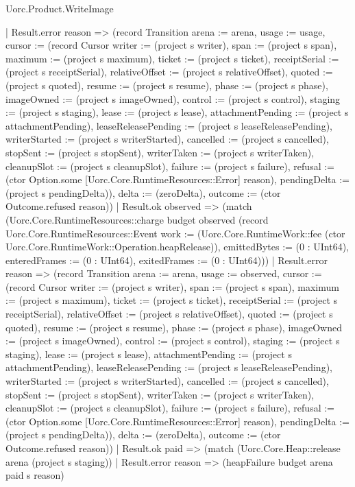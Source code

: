 \begin{lexlean}{Uorc.Product.WriteImage}
\begin{semanticmodule}
{        | Result.error reason => (record Transition {arena := arena, usage := usage, cursor := (record Cursor {writer := (project s writer), span := (project s span), maximum := (project s maximum), ticket := (project s ticket), receiptSerial := (project s receiptSerial), relativeOffset := (project s relativeOffset), quoted := (project s quoted), resume := (project s resume), phase := (project s phase), imageOwned := (project s imageOwned), control := (project s control), staging := (project s staging), lease := (project s lease), attachmentPending := (project s attachmentPending), leaseReleasePending := (project s leaseReleasePending), writerStarted := (project s writerStarted), cancelled := (project s cancelled), stopSent := (project s stopSent), writerTaken := (project s writerTaken), cleanupSlot := (project s cleanupSlot), failure := (project s failure), refusal := (ctor Option.some [Uorc.Core.RuntimeResources::Error] reason), pendingDelta := (project s pendingDelta)}), delta := (zeroDelta), outcome := (ctor Outcome.refused reason)})
        | Result.ok observed => (match (Uorc.Core.RuntimeResources::charge budget observed (record Uorc.Core.RuntimeResources::Event {work := (Uorc.Core.RuntimeWork::fee (ctor Uorc.Core.RuntimeWork::Operation.heapRelease)), emittedBytes := (0 : UInt64), enteredFrames := (0 : UInt64), exitedFrames := (0 : UInt64)}))
          | Result.error reason => (record Transition {arena := arena, usage := observed, cursor := (record Cursor {writer := (project s writer), span := (project s span), maximum := (project s maximum), ticket := (project s ticket), receiptSerial := (project s receiptSerial), relativeOffset := (project s relativeOffset), quoted := (project s quoted), resume := (project s resume), phase := (project s phase), imageOwned := (project s imageOwned), control := (project s control), staging := (project s staging), lease := (project s lease), attachmentPending := (project s attachmentPending), leaseReleasePending := (project s leaseReleasePending), writerStarted := (project s writerStarted), cancelled := (project s cancelled), stopSent := (project s stopSent), writerTaken := (project s writerTaken), cleanupSlot := (project s cleanupSlot), failure := (project s failure), refusal := (ctor Option.some [Uorc.Core.RuntimeResources::Error] reason), pendingDelta := (project s pendingDelta)}), delta := (zeroDelta), outcome := (ctor Outcome.refused reason)})
          | Result.ok paid => (match (Uorc.Core.Heap::release arena (project s staging))
            | Result.error reason => (heapFailure budget arena paid s reason)
}
\end{semanticmodule}
\end{lexlean}
